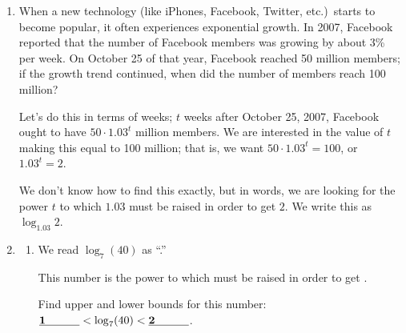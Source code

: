 \documentclass{article}
\begin{document}
\begin{enumerate}
\item  \label{tech-exponential}



  \begin{problem}[\vfill]
    When a new technology (like iPhones, Facebook, Twitter, etc.)\ starts to become popular, it often experiences exponential growth. In 2007, Facebook reported that the number of Facebook members was growing by about 3\% per week. On October 25 of that year, Facebook reached 50 million members; if the growth trend continued, when did the number of members reach 100 million?
  \end{problem}

  \begin{solution}
    Let's do this in terms of weeks; $t$ weeks after October 25, 2007, 
    Facebook ought to have $50 \cdot 1.03^t$ million members.  We are
    interested in the value of $t$ making this equal to 100 million; that
    is, we want $50 \cdot 1.03^t = 100$, or $1.03^t = 2$.

    We don't know how to find this exactly, but in words, we are looking
    for the power $t$ to which $1.03$ must be raised in order to get $2$.
    We write this as $\boxed{\log_{1.03} 2}$.
  \end{solution}

\item  \label{log-intro}


  \begin{enumerate}
  \item We read $\log_{7} (40)$ as ``.''

    This number is the power to which  must be raised in order to get .

    Find upper and lower bounds for this number: $\fitb{0.5in}{1} < \log_7 (40) < \fitb{0.5in}{2}$.

    \pspace{0.5in}


\end{enumerate}
\end{enumerate}
\end{document}
